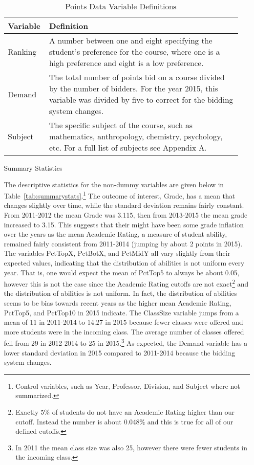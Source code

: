 \documentclass[12pt,a4paper,english,fleqn]{article}
\makeatletter
\newcommand{\tablelabel}[1]{Table~\ref{#1}}
\renewcommand\subsection{\@startsection{subsection}{2}
{\z@}{-3.25ex\@plus -1ex \@minus -.2ex}{1.5ex \@plus .2ex}{\normalfont\bf}}
\makeatother
\begin{document}
\begin{table}[htb]
  \centering
  \caption{Points Data Variable Definitions}\label{tab:def2}
  \begin{tabular}{|p{0.15\linewidth}|p{0.8\linewidth}|} 
    \hline\hline
    Variable & Definition \\ [0.5ex] 
    \hline\hline
    Ranking & A number between one and eight specifying the student's preference for the course, where one is a high preference and eight is a low preference. \\ 
    \hline
    Demand & The total number of points bid on a course divided by the number of bidders. For the year 2015, this variable was divided by five to correct for the bidding system changes.\\
    \hline
    Subject & The specific subject of the course, such as mathematics, anthropology, chemistry, psychology, etc. For a full list of subjects see Appendix A. \\
    [1ex] 
    \hline\hline
  \end{tabular}
\end{table}

\subsection{Summary Statistics}\label{summarystats}

The descriptive statistics for the non-dummy variables are given below in \tablelabel{tab:summarystats}.\footnote{Control variables, such as Year, Professor, Division, and Subject where not summarized.} 
The outcome of interest, Grade, has a mean that changes slightly over time, while the standard deviation remains fairly constant. 
From 2011-2012 the mean Grade was 3.115, then from 2013-2015 the mean grade increased to 3.15. 
This suggests that their might have been some grade inflation over the years as the mean Academic Rating, a measure of student ability, remained fairly consistent from 2011-2014 (jumping by about 2 points in 2015). 
The variables PctTopX, PctBotX, and PctMidY all vary slightly from their expected values, indicating that the distribution of abilities is not uniform every year. 
That is, one would expect the mean of PctTop5 to always be about 0.05, however this is not the case since the Academic Rating cutoffs are not exact\footnote{Exactly 5\% of students do not have an Academic Rating higher than our cutoff. Instead the number is about 0.048\% and this is true for all of our defined cutoffs.} and the distribution of abilities is not uniform. 
In fact, the distribution of abilities seems to be bias towards recent years as the higher mean Academic Rating, PctTop5, and PctTop10 in 2015 indicate. 
The ClassSize variable jumps from a mean of 11 in 2011-2014 to 14.27 in 2015 because fewer classes were offered and more students were in the incoming class.
The average number of classes offered fell from 29 in 2012-2014 to 25 in 2015.\footnote{In 2011 the mean class size was also 25, however there were fewer students in the incoming class.}
As expected, the Demand variable has a lower standard deviation in 2015 compared to 2011-2014 because the bidding system changes. 
\end{document}
